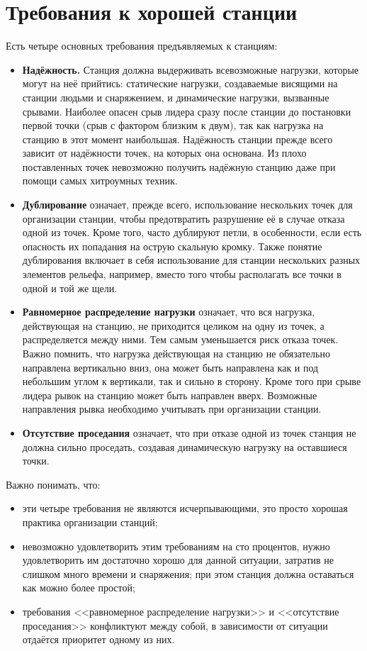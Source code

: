 \documentclass[fleqn, 12pt]{extarticle}
\begin{document}
\section{Требования к хорошей станции}
	Есть четыре основных требования предъявляемых к станциям:
    \begin{itemize}
        \item \textbf{Надёжность.} Станция должна выдерживать всевозможные нагрузки, которые могут на неё прийтись: статические нагрузки, создаваемые висящими на станции людьми
                и снаряжением, и динамические нагрузки, вызванные срывами. Наиболее опасен срыв лидера сразу после станции до постановки первой точки (срыв с фактором близким к двум),
                так как нагрузка на станцию в этот момент наибольшая. Надёжность станции прежде всего зависит от надёжности точек, на которых она основана. 
                Из плохо поставленных точек невозможно получить надёжную станцию даже при помощи самых хитроумных техник.
        \item \textbf{Дублирование} означает, прежде всего, использование нескольких точек для организации станции, чтобы предотвратить разрушение её в случае отказа одной из точек. 
                Кроме того, часто дублируют петли, в особенности, если есть опасность их попадания на острую скальную кромку. Также понятие дублирования включает в себя использование 
                для станции нескольких разных элементов рельефа, например, вместо того чтобы располагать все точки в одной и той же щели.
        \item \textbf{Равномерное распределение нагрузки} означает, что вся нагрузка, действующая на станцию, не приходится целиком на одну из точек, а распределяется между ними. 
                Тем самым уменьшается риск отказа точек. Важно помнить, что нагрузка действующая на станцию не обязательно направлена вертикально вниз, она может быть направлена как 
                и под небольшим углом к вертикали, так и сильно в сторону. Кроме того при срыве лидера рывок на станцию может быть направлен вверх. Возможные направления рывка 
                необходимо учитывать при организации станции.
        \item \textbf{Отсутствие проседания} означает, что при отказе одной из точек станция не должна сильно проседать, создавая динамическую нагрузку на оставшиеся точки.
    \end{itemize}
    
    Важно понимать, что:
    \begin{itemize}
        \item эти четыре требования не являются исчерпывающими, это просто хорошая практика организации станций;
        \item невозможно удовлетворить этим требованиям на сто процентов, нужно удовлетворить им достаточно хорошо для данной ситуации, затратив не слишком много времени и снаряжения; 
              при этом станция должна оставаться как можно более простой;
        \item требования <<равномерное распределение нагрузки>> и <<отсутствие проседания>> конфликтуют между собой, в зависимости от ситуации отдаётся приоритет одному из них.
    \end{itemize}
\end{document}
